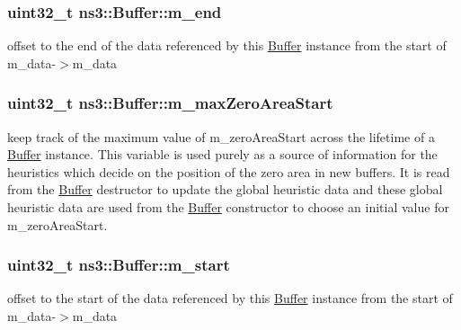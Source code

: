 \subsubsection[{\texorpdfstring{m\+\_\+end}{m_end}}]{\setlength{\rightskip}{0pt plus 5cm}uint32\+\_\+t ns3\+::\+Buffer\+::m\+\_\+end\hspace{0.3cm}{\ttfamily [private]}}\hypertarget{classns3_1_1Buffer_a1f83bdf72c64ddd2a2e862b64236f29d}{}\label{classns3_1_1Buffer_a1f83bdf72c64ddd2a2e862b64236f29d}
offset to the end of the data referenced by this \hyperlink{classns3_1_1Buffer}{Buffer} instance from the start of m\+\_\+data-\/$>$m\+\_\+data 
\subsubsection[{\texorpdfstring{m\+\_\+max\+Zero\+Area\+Start}{m_maxZeroAreaStart}}]{\setlength{\rightskip}{0pt plus 5cm}uint32\+\_\+t ns3\+::\+Buffer\+::m\+\_\+max\+Zero\+Area\+Start\hspace{0.3cm}{\ttfamily [private]}}\hypertarget{classns3_1_1Buffer_a5dd43f19f0e7d518b0fbd677e322f2cb}{}\label{classns3_1_1Buffer_a5dd43f19f0e7d518b0fbd677e322f2cb}
keep track of the maximum value of m\+\_\+zero\+Area\+Start across the lifetime of a \hyperlink{classns3_1_1Buffer}{Buffer} instance. This variable is used purely as a source of information for the heuristics which decide on the position of the zero area in new buffers. It is read from the \hyperlink{classns3_1_1Buffer}{Buffer} destructor to update the global heuristic data and these global heuristic data are used from the \hyperlink{classns3_1_1Buffer}{Buffer} constructor to choose an initial value for m\+\_\+zero\+Area\+Start. 
\subsubsection[{\texorpdfstring{m\+\_\+start}{m_start}}]{\setlength{\rightskip}{0pt plus 5cm}uint32\+\_\+t ns3\+::\+Buffer\+::m\+\_\+start\hspace{0.3cm}{\ttfamily [private]}}\hypertarget{classns3_1_1Buffer_afbea962435250b6a0a6c860c50b75386}{}\label{classns3_1_1Buffer_afbea962435250b6a0a6c860c50b75386}
offset to the start of the data referenced by this \hyperlink{classns3_1_1Buffer}{Buffer} instance from the start of m\+\_\+data-\/$>$m\+\_\+data 
